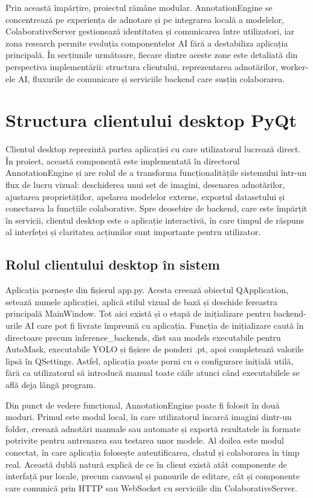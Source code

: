 Prin această împărțire, proiectul rămâne modular. AnnotationEngine se concentrează pe experiența de adnotare și pe integrarea locală a modelelor, ColaborativeServer gestionează identitatea și comunicarea între utilizatori, iar zona research permite evoluția componentelor AI fără a destabiliza aplicația principală. În secțiunile următoare, fiecare dintre aceste zone este detaliată din perspectiva implementării: structura clientului, reprezentarea adnotărilor, worker-ele AI, fluxurile de comunicare și serviciile backend care susțin colaborarea.

\section{Structura clientului desktop PyQt}

Clientul desktop reprezintă partea aplicației cu care utilizatorul lucrează direct. În proiect, această componentă este implementată în directorul AnnotationEngine și are rolul de a transforma funcționalitățile sistemului într-un flux de lucru vizual: deschiderea unui set de imagini, desenarea adnotărilor, ajustarea proprietăților, apelarea modelelor externe, exportul datasetului și conectarea la funcțiile colaborative. Spre deosebire de backend, care este împărțit în servicii, clientul desktop este o aplicație interactivă, în care timpul de răspuns al interfeței și claritatea acțiunilor sunt importante pentru utilizator.

\subsection{Rolul clientului desktop în sistem}

Aplicația pornește din fișierul app.py. Acesta creează obiectul QApplication, setează numele aplicației, aplică stilul vizual de bază și deschide fereastra principală MainWindow. Tot aici există și o etapă de inițializare pentru backend-urile AI care pot fi livrate împreună cu aplicația. Funcția de inițializare caută în directoare precum inference\_backends, dist sau models executabile pentru AutoMask, executabile YOLO și fișiere de ponderi .pt, apoi completează valorile lipsă în QSettings. Astfel, aplicația poate porni cu o configurare inițială utilă, fără ca utilizatorul să introducă manual toate căile atunci când executabilele se află deja lângă program.

Din punct de vedere funcțional, AnnotationEngine poate fi folosit în două moduri. Primul este modul local, în care utilizatorul încarcă imagini dintr-un folder, creează adnotări manuale sau automate și exportă rezultatele în formate potrivite pentru antrenarea sau testarea unor modele. Al doilea este modul conectat, în care aplicația folosește autentificarea, chatul și colaborarea în timp real. Această dublă natură explică de ce în client există atât componente de interfață pur locale, precum canvasul și panourile de editare, cât și componente care comunică prin HTTP sau WebSocket cu serviciile din ColaborativeServer.


